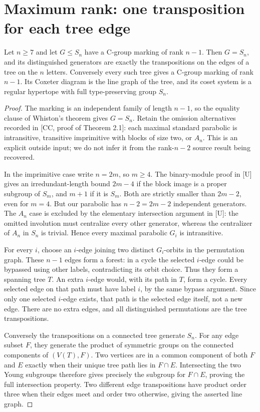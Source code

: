 \section{Maximum rank: one transposition for each tree edge}
\begin{theorem}\label{thm:maxrank}
Let $n\geq7$ and let $G\leq S_n$ have a C-group marking of rank
$n-1$. Then $G=S_n$, and its distinguished generators are exactly
the transpositions on the edges of a tree on the $n$ letters.
Conversely every such tree gives a C-group marking of rank $n-1$.
Its Coxeter diagram is the line graph of the tree, and its coset system
is a regular hypertope with full type-preserving group $S_n$.
\end{theorem}
\begin{proof}
The marking is an independent family of length $n-1$, so the equality
clause of Whiston's theorem gives $G=S_n$. Retain the omission
alternatives recorded in [CC, proof of Theorem 2.1]: each maximal
standard parabolic is intransitive, transitive imprimitive with blocks
of size two, or $A_n$. This is an explicit outside input; we do not
infer it from the rank-$n-2$ source result being recovered.

In the imprimitive case write $n=2m$, so $m\geq4$. The binary-module
proof in [U] gives an irredundant-length bound $2m-4$ if the block
image is a proper subgroup of $S_m$, and $m+1$ if it is $S_m$.
Both are strictly smaller than $2m-2$, even for $m=4$. But our
parabolic has $n-2=2m-2$ independent generators. The $A_n$ case is
excluded by the elementary intersection argument in [U]: the omitted
involution must centralize every other generator, whereas the
centralizer of $A_n$ in $S_n$ is trivial. Hence every maximal
parabolic $G_i$ is intransitive.

For every $i$, choose an $i$-edge joining two distinct $G_i$-orbits
in the permutation graph. These $n-1$ edges form a forest: in a
cycle the selected $i$-edge could be bypassed using other labels,
contradicting its orbit choice. Thus they form a spanning tree $T$.
An extra $i$-edge would, with its path in $T$, form a cycle. Every
selected edge on that path must have label $i$, by the same bypass
argument. Since only one selected $i$-edge exists, that path is the
selected edge itself, not a new edge. There are no extra edges,
and all distinguished permutations are the tree transpositions.

Conversely the transpositions on a connected tree generate $S_n$.
For any edge subset $F$, they generate the product of symmetric groups
on the connected components of $(V(T),F)$. Two vertices are in a common
component of both $F$ and $E$ exactly when their unique tree path lies
in $F\cap E$. Intersecting the two Young subgroups therefore gives
precisely the subgroup for $F\cap E$, proving the full intersection
property. Two different edge transpositions have product order three
when their edges meet and order two otherwise, giving the asserted
line graph.


\end{proof}
